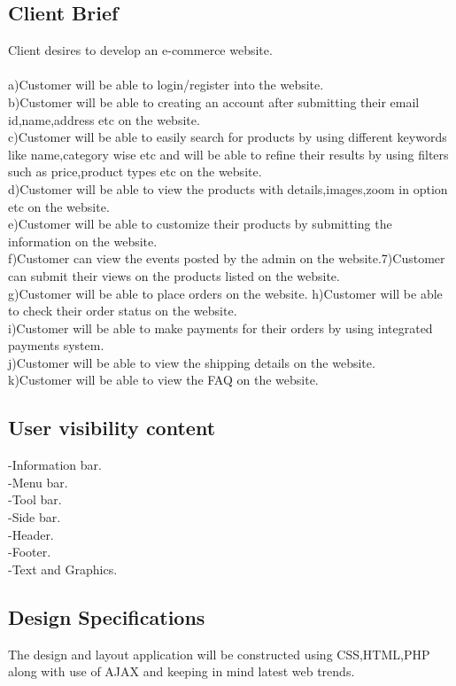 \documentclass{article}
\begin{document}
\subsection{Client Brief}
Client desires to develop an e-commerce website.\\
\\
a)Customer will be able to login/register into the website.\\
b)Customer will be able to creating an account after submitting
their email id,name,address etc on the website.\\
c)Customer will be able to easily search for products by using
different keywords like name,category wise etc and will be able to
refine their results by using filters such as price,product types etc
on the website.\\
d)Customer will be able to view the products with
details,images,zoom in option etc on the website.\\
e)Customer will be able to customize their products by submitting
the information on the website.\\
f)Customer can view the events posted by the admin on the
website.7)Customer can submit their views on the products listed on the
website.\\
g)Customer will be able to place orders on the website.
h)Customer will be able to check their order status on the website.\\
i)Customer will be able to make payments for their orders by
using integrated payments system.\\
j)Customer will be able to view the shipping details on the
website.\\
k)Customer will be able to view the FAQ on the website.\\


\subsection{User visibility content}
-Information bar.\\
-Menu bar.\\
-Tool bar.\\
-Side bar.\\
-Header.\\
-Footer.\\
-Text and Graphics.\\


\subsection{Design Specifications}
The design and layout application will be constructed using
CSS,HTML,PHP along with use of AJAX and keeping in mind
latest web trends.
\\
\end{document}
